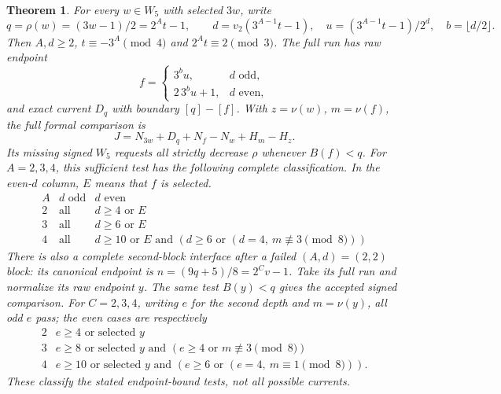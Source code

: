 \documentclass[11pt]{article}
\newtheorem{theorem}{Theorem}
\begin{document}
\begin{theorem}\label{thm:selectedforward}
For every $w\in W_5$ with selected $3w$, write
\[
 q=\rho(w)=(3w-1)/2=2^A t-1,\qquad
 d=v_2(3^{A-1}t-1),\quad u=(3^{A-1}t-1)/2^d,
 \quad b=\lfloor d/2\rfloor.
\]
Then $A,d\ge2$, $t\equiv-3^A\pmod4$ and $2^At\equiv2\pmod3$.
The full run has raw endpoint
\[
 f=\begin{cases}3^b u,&d\text{ odd},\\2\,3^b u+1,&d\text{ even},\end{cases}
\]
and exact current $D_q$ with boundary $[q]-[f]$.
With $z=\nu(w)$, $m=\nu(f)$, the full formal comparison is
\[
 J=N_{3w}+D_q+N_f-N_w+H_m-H_z.
\]
Its missing signed $W_5$ requests all strictly decrease $\rho$ whenever
$B(f)<q$. For $A=2,3,4$, this sufficient test has the following complete
classification. In the even-$d$ column, $E$ means that $f$ is selected.
\[
\begin{array}{c|c|l}
 A&d\text{ odd}&d\text{ even}\\\hline
 2&\text{all}&d\ge4\text{ or }E\\
 3&\text{all}&d\ge6\text{ or }E\\
 4&\text{all}&d\ge10\text{ or }
 E\text{ and }(d\ge6\text{ or }(d=4,\ m\not\equiv3\pmod8))
\end{array}
\]
There is also a complete second-block interface after a failed
$(A,d)=(2,2)$ block: its canonical endpoint is
$n=(9q+5)/8=2^C v-1$. Take its full run and normalize its raw endpoint
$y$. The same test $B(y)<q$ gives the accepted signed comparison.
For $C=2,3,4$, writing $e$ for the second depth and $m=\nu(y)$, all
odd $e$ pass; the even cases are respectively
\[
\begin{array}{c|l}
2&e\ge4\text{ or selected }y\\
3&e\ge8\text{ or selected }y\text{ and }(e\ge4\text{ or }m\not\equiv3\pmod8)\\
4&e\ge10\text{ or selected }y\text{ and }(e\ge6\text{ or }(e=4,\ m\equiv1\pmod8)).
\end{array}
\]
These classify the stated endpoint-bound tests, not all possible currents.
\end{theorem}
\end{document}
